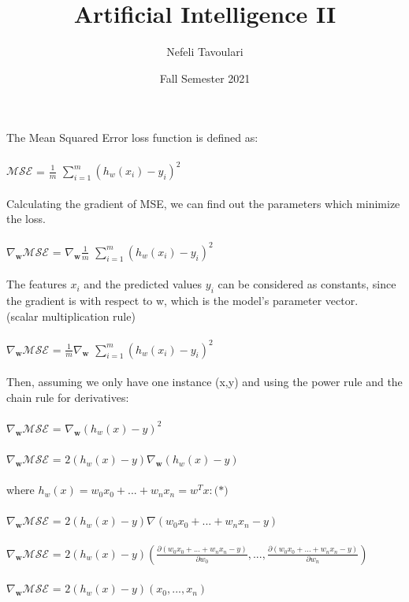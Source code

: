 \documentclass{article}
\title{\Huge Artificial Intelligence II}
\author{\LARGE Nefeli Tavoulari}
\date{\LARGE Fall Semester 2021}
\begin{document}
\maketitle

\section{}\Large The Mean Squared Error loss function is defined as:\\ \\
 $\mathcal{MSE} $ =  $\frac{1}{m}$ $\sum_{i=1}^{m}(h_w(x_i) - y_i)^2$ \\ \\
 Calculating the gradient of MSE, we can find out the parameters which minimize the loss. \\ \\
$\nabla_{\!\mathbf{w}}\mathcal{MSE} $ =  $\nabla_{\!\mathbf{w}}\frac{1}{m}$ $\sum_{i=1}^{m}(h_w(x_i) - y_i)^2$ \\ \\
The features $x_i$ and the predicted values $y_i$ can be considered as constants, since the gradient is with respect to w, which is the model’s parameter vector. \\ (scalar multiplication rule) \\ \\
$\nabla_{\!\mathbf{w}}\mathcal{MSE} $ =  $\frac{1}{m}\nabla_{\!\mathbf{w}}$ $\sum_{i=1}^{m}(h_w(x_i) - y_i)^2$ \\ \\
Then, assuming we only have one instance (x,y) and using the power rule and the chain rule for derivatives: \\ \\
$\nabla_{\!\mathbf{w}}\mathcal{MSE} $ = $\nabla_{\!\mathbf{w}}$$(h_w(x) - y)^2$ \\ \\
$\nabla_{\!\mathbf{w}}\mathcal{MSE} $ = $2(h_w(x) - y)\nabla_{\!\mathbf{w}}$$(h_w(x) - y)$ \\ \\
where $h_w(x) = w_0x_0 + ... + w_nx_n = w^Tx: \textbf{(*)}$\\ \\
$\nabla_{\!\mathbf{w}}\mathcal{MSE} $ = $2(h_w(x) - y)\nabla (w_0x_0 + ... + w_nx_n - y)  $ \\ \\
$\nabla_{\!\mathbf{w}}\mathcal{MSE} $ = $2(h_w(x) - y)$$(\frac{\partial (w_0x_0 + ... + w_nx_n - y)}{\partial w_0} , ... , \frac{\partial (w_0x_0 + ... + w_nx_n - y)}{\partial w_n}) $ \\ \\ 
$\nabla_{\!\mathbf{w}}\mathcal{MSE} $ = $2(h_w(x) - y)$$(x_0 , ... , x_n)$ \\ \\ 
\end{document}
